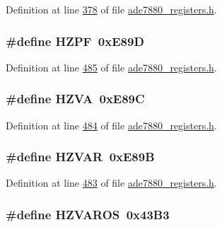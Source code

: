 Definition at line \hyperlink{a00036_source_l00378}{378} of file \hyperlink{a00036_source}{ade7880\-\_\-registers.\-h}.

\hypertarget{a00036_a79d893d611b3b5c28395f81a070844b5}{
\subsubsection[{H\-Z\-P\-F}]{\setlength{\rightskip}{0pt plus 5cm}\#define H\-Z\-P\-F~0x\-E89\-D}}\label{de/d8c/a00036_a79d893d611b3b5c28395f81a070844b5}


Definition at line \hyperlink{a00036_source_l00485}{485} of file \hyperlink{a00036_source}{ade7880\-\_\-registers.\-h}.

\hypertarget{a00036_aa7c156f6b0fe00c1c83008c3469a006b}{
\subsubsection[{H\-Z\-V\-A}]{\setlength{\rightskip}{0pt plus 5cm}\#define H\-Z\-V\-A~0x\-E89\-C}}\label{de/d8c/a00036_aa7c156f6b0fe00c1c83008c3469a006b}


Definition at line \hyperlink{a00036_source_l00484}{484} of file \hyperlink{a00036_source}{ade7880\-\_\-registers.\-h}.

\hypertarget{a00036_acc4d6765ba1ad97bd9055403813255f0}{
\subsubsection[{H\-Z\-V\-A\-R}]{\setlength{\rightskip}{0pt plus 5cm}\#define H\-Z\-V\-A\-R~0x\-E89\-B}}\label{de/d8c/a00036_acc4d6765ba1ad97bd9055403813255f0}


Definition at line \hyperlink{a00036_source_l00483}{483} of file \hyperlink{a00036_source}{ade7880\-\_\-registers.\-h}.

\hypertarget{a00036_a4769834a92cbd1fe75e81ad8082bf8c2}{
\subsubsection[{H\-Z\-V\-A\-R\-O\-S}]{\setlength{\rightskip}{0pt plus 5cm}\#define H\-Z\-V\-A\-R\-O\-S~0x43\-B3}}\label{de/d8c/a00036_a4769834a92cbd1fe75e81ad8082bf8c2}


